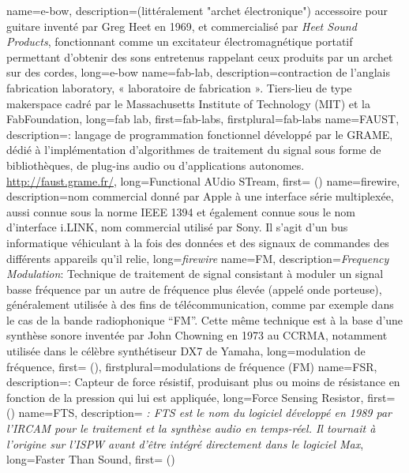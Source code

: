 {
    name={e-bow},
    description={(littéralement "archet électronique") accessoire pour guitare inventé par Greg Heet en 1969, et commercialisé par \textit{Heet Sound Products}, fonctionnant comme un excitateur électromagnétique portatif permettant d'obtenir des sons entretenus rappelant ceux produits par un archet sur des cordes},
    long={e-bow}
}
{
    name={fab-lab},
    description={contraction de l'anglais fabrication laboratory, « laboratoire de fabrication ». Tiers-lieu de type \gls{makerspace} cadré par le Massachusetts Institute of Technology (MIT) et la FabFoundation},
    long={fab lab},
    first={fab-labs},
    firstplural={fab-labs}
}
{
    name={FAUST},
    description={\textit{}: langage de programmation fonctionnel développé par le \gls{GRAME}, dédié à l'implémentation d'algorithmes de traitement du signal sous forme de bibliothèques, de plug-ins audio ou d'applications autonomes. \url{http://faust.grame.fr/}},
    long={Functional AUdio STream},
    first={ ()}
}
{
    name={firewire},
    description={nom commercial donné par Apple à une interface série multiplexée, aussi connue sous la norme IEEE 1394 et également connue sous le nom d'interface i.LINK, nom commercial utilisé par Sony. Il s'agit d'un bus informatique véhiculant à la fois des données et des signaux de commandes des différents appareils qu'il relie},
    long={\textit{firewire}}
}
{
    name={FM},
    description={\textit{Frequency Modulation}: Technique de traitement de signal consistant à moduler un signal basse fréquence par un autre de fréquence plus élevée (appelé onde porteuse), généralement utilisée à des fins de télécommunication, comme par exemple dans le cas de la bande radiophonique ``FM''. Cette même technique est à la base d'une synthèse sonore inventée par John Chowning en 1973 au \gls{CCRMA}, notamment utilisée dans le célèbre synthétiseur DX7 de Yamaha},
    long={modulation de fréquence},
    first={ ()},
    firstplural={modulations de fréquence (FM)}
}
{
    name={FSR},
    description={\textit{}: Capteur de force résistif, produisant plus ou moins de résistance en fonction de la pression qui lui est appliquée},
    long={Force Sensing Resistor},
    first={ ()}
}
{
    name={FTS},
    description={\textit{ : FTS est le nom du logiciel développé en 1989 par l'IRCAM pour le traitement et la synthèse audio en temps-réel. Il tournait à l'origine sur l'\gls{ISPW} avant d'être intégré directement dans le logiciel Max}},
    long={Faster Than Sound},
    first={ ()}
}
